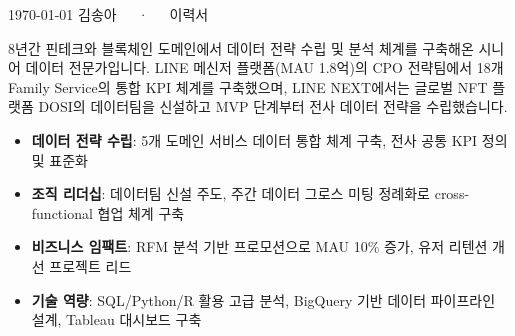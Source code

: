 \documentclass[11pt, a4paper]{awesome-cv}
\begin{document}
\makecvheader[C]

\makecvfooter
  {\today}
  {김송아~~~·~~~이력서}
  {\thepage}




\begin{cvparagraph}
8년간 핀테크와 블록체인 도메인에서 데이터 전략 수립 및 분석 체계를 구축해온 시니어 데이터 전문가입니다. 
LINE 메신저 플랫폼(MAU 1.8억)의 CPO 전략팀에서 18개 Family Service의 통합 KPI 체계를 구축했으며, 
LINE NEXT에서는 글로벌 NFT 플랫폼 DOSI의 데이터팀을 신설하고 MVP 단계부터 전사 데이터 전략을 수립했습니다.
\end{cvparagraph}


\begin{itemize}[leftmargin=*]
    \item \textbf{데이터 전략 수립}: 5개 도메인 서비스 데이터 통합 체계 구축, 전사 공통 KPI 정의 및 표준화
    \item \textbf{조직 리더십}: 데이터팀 신설 주도, 주간 데이터 그로스 미팅 정례화로 cross-functional 협업 체계 구축
    \item \textbf{비즈니스 임팩트}: RFM 분석 기반 프로모션으로 MAU 10\% 증가, 유저 리텐션 개선 프로젝트 리드
    \item \textbf{기술 역량}: SQL/Python/R 활용 고급 분석, BigQuery 기반 데이터 파이프라인 설계, Tableau 대시보드 구축
\end{itemize}

\end{document}
